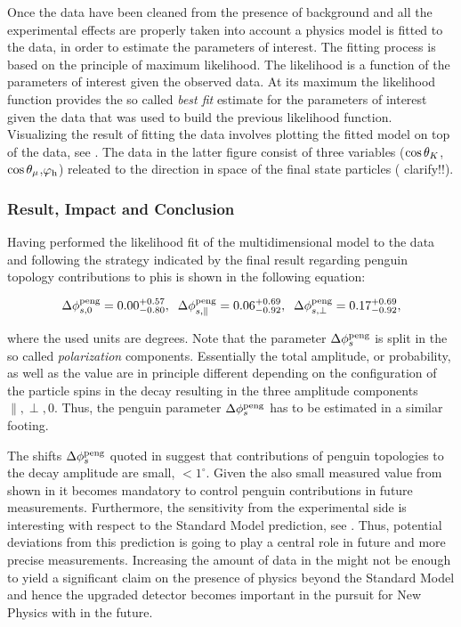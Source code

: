 Once the data have been cleaned from the presence of background and all the experimental effects are
properly taken into account a physics model is fitted to the data, in order to estimate the parameters of interest.
The fitting process is based on the principle of maximum likelihood. The likelihood is a
function of the parameters of interest given the observed data. At its maximum the likelihood function
provides the so called {\it best fit} estimate for the parameters of interest given the data that was
used to build the previous likelihood function. Visualizing the result of fitting the data involves
plotting the fitted model on top of the data, see . The data in the
latter figure consist of three variables ($\cos\theta_{K}$,$\cos\theta_{\mu}$,$\varphi_{\rm h}$) releated to the
direction in space of the final state particles ({\color{red} clarify!!}).


\subsubsection{Result, Impact and Conclusion}

Having performed the likelihood fit of the multidimensional model to the data and
following the strategy indicated by \cite{Fleischer:1999zi,Faller:2008gt,DeBruyn:2014oga,DeBruyn-thesis}
the final result regarding penguin topology contributions to phis is shown in the following equation:

\begin{equation}
\label{app_delta_phis_result}
  \Delta\phi^{\rm peng}_{s,{0}}         = 0.00 ^{+0.57}_{-0.80}, \;\;
  \Delta\phi^{\rm peng}_{s,{\parallel}} = 0.06 ^{+0.69}_{-0.92}, \;\;
  \Delta\phi^{\rm peng}_{s,{\perp}}     = 0.17 ^{+0.69}_{-0.92},
\end{equation}


\noindent where the used units are degrees. Note that the parameter $\Delta\phi_{s}^{\tiny\text{peng}}$ is split in the so called {\it polarization}
components. Essentially the total \BsJpsiPhi amplitude, or probability, as well as the \phis value
are in principle different depending on the configuration of the particle spins in the \BsJpsiPhi
decay resulting in the three amplitude components $\parallel,\perp,0$. Thus, the penguin parameter
$\Delta\phi_{s}^{\tiny\text{peng}}$ has to be estimated in a similar footing.

The shifts $\Delta\phi_{s}^{\tiny\text{peng}}$ quoted in 
suggest that contributions of penguin topologies to the \BsJpsiPhi decay amplitude are
small, $<1^\circ$. Given the also small \phis measured value from \lhcb shown in 
it becomes mandatory to control penguin contributions in future \phis measurements.
Furthermore, the sensitivity from the experimental side is interesting with respect to
the Standard Model prediction, see . Thus, potential deviations from this
prediction is going to play a central role in future and more precise \phis measurements.
Increasing the amount of data in the \lhc \runtwo might not be enough to yield
a significant claim on the presence of physics beyond the Standard Model and hence
the upgraded \lhcb detector becomes important in the pursuit for New Physics with \phis in the future.
